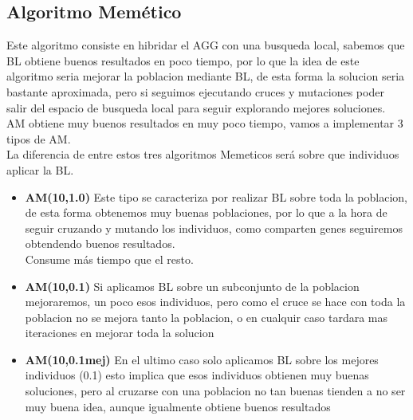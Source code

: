 \subsection{Algoritmo Memético}

Este algoritmo consiste en hibridar el AGG con una busqueda local, sabemos que  BL obtiene buenos resultados en poco tiempo, por lo que la
idea de este algoritmo seria mejorar la poblacion mediante BL, de esta forma la solucion seria bastante aproximada, pero si seguimos ejecutando cruces y mutaciones
poder salir del espacio de busqueda local para seguir explorando mejores soluciones.\\
AM obtiene muy buenos resultados en muy poco tiempo, vamos a implementar 3 tipos de AM.\\
La diferencia de entre estos tres algoritmos Memeticos será sobre que individuos aplicar la BL.\\
\begin{itemize}

  \item \textbf{AM(10,1.0)} Este tipo se caracteriza por realizar BL sobre  toda la poblacion, de esta forma
   obtenemos muy buenas poblaciones, por lo que a la hora de seguir cruzando y mutando los individuos, como 
   comparten genes seguiremos obtendendo buenos resultados. \\
   Consume más tiempo que el resto.
  \item \textbf{AM(10,0.1)} Si aplicamos BL sobre un subconjunto de la poblacion mejoraremos, un poco esos 
  individuos, pero como el cruce se hace con toda la poblacion no se mejora tanto la poblacion, o en cualquir 
  caso tardara mas iteraciones en mejorar toda la solucion
  \item \textbf{AM(10,0.1mej)} En el ultimo caso solo aplicamos BL sobre los mejores individuos (0.1) esto 
  implica que esos individuos obtienen muy buenas soluciones, pero al cruzarse con una poblacion no tan buenas
   tienden a no ser muy buena idea, aunque igualmente obtiene buenos resultados

\end{itemize}

